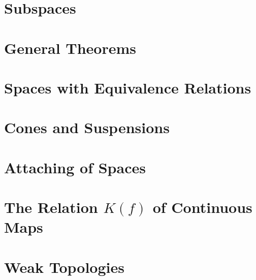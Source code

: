 \section{Subspaces}

\section{General Theorems}

\section{Spaces with Equivalence Relations}

\section{Cones and Suspensions}

\section{Attaching of Spaces}

\section{The Relation \(K(f)\) of Continuous Maps}

\section{Weak Topologies}

